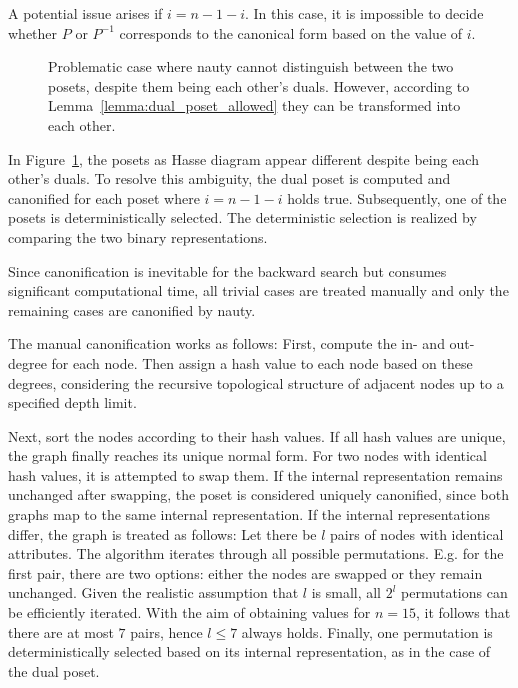 \documentclass[twoside,leqno,twocolumn]{article}
\begin{document}
A potential issue arises if $i = n - 1 - i$.
In this case, it is impossible to decide whether $P$ or $P^{-1}$ corresponds to the canonical form based on the value of $i$.

\begin{figure}[!b]
  \centering
  
  \caption{Problematic case where nauty cannot distinguish between the two posets, despite them being each other's duals. However, according to Lemma~\ref{lemma:dual_poset_allowed} they can be transformed into each other.} %
  \label{fig:backward_canonify_problematic}
\end{figure}



In Figure~\ref{fig:backward_canonify_problematic}, the posets as Hasse diagram appear different despite being each other's duals.
To resolve this ambiguity, the dual poset is computed and canonified for each poset where $i = n - 1 - i$ holds true.
Subsequently, one of the posets is deterministically selected.
The deterministic selection is realized by comparing the two binary representations.

Since canonification is inevitable for the backward search but consumes significant computational time, all trivial cases are treated manually and only the remaining cases are canonified by nauty.

The manual canonification works as follows:
First, compute the in- and out-degree for each node.
Then assign a hash value to each node based on these degrees, considering the recursive topological structure of adjacent nodes up to a specified depth limit.

Next, sort the nodes according to their hash values. %
If all hash values are unique, the graph finally reaches its unique normal form. %
For two nodes with identical hash values, it is attempted to swap them.
If the internal representation remains unchanged after swapping, the poset is considered uniquely canonified, since both graphs map to the same internal representation.
If the internal representations differ, the graph is treated as follows:
Let there be $l$ pairs of nodes with identical attributes.
The algorithm iterates through all possible permutations.
E.g. for the first pair, there are two options: either the nodes are swapped or they remain unchanged. %
Given the realistic assumption that $l$ is small, all $2^l$ permutations can be efficiently iterated.
With the aim of obtaining values for $n = 15$, it follows that there are at most $7$ pairs, hence $l \leq 7$ always holds.
Finally, one permutation is deterministically selected based on its internal representation, as in the case of the dual poset.
\end{document}
